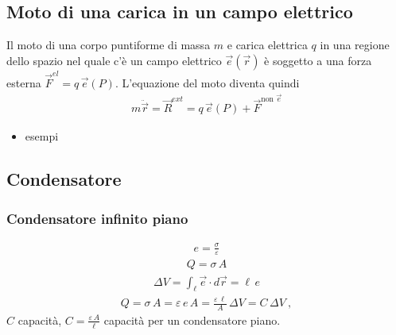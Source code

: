 \documentclass[letterpaper,10pt,italian]{jupyterBook}
\begin{document}
\subsection{Moto di una carica in un campo elettrico}
\label{\detokenize{ch/electromagnetism/electrostatics:moto-di-una-carica-in-un-campo-elettrico}}
\sphinxAtStartPar
Il moto di una corpo puntiforme di massa \(m\) e carica elettrica \(q\) in una regione dello spazio nel quale c’è un campo elettrico \(\vec{e}(\vec{r})\) è soggetto a una forza esterna \(\vec{F}^{el} = q \, \vec{e}(P)\). L’equazione del moto diventa quindi
\begin{equation*}
\begin{split}m \ddot{ \vec{r} } = \vec{R}^{ext} = q \, \vec{e}(P) + \vec{F}^{\text{non }\vec{e}}\end{split}
\end{equation*}\begin{itemize}
\item {} 
\sphinxAtStartPar
{} esempi

\end{itemize}


\subsection{Condensatore}
\label{\detokenize{ch/electromagnetism/electrostatics:condensatore}}

\subsubsection{Condensatore infinito piano}
\label{\detokenize{ch/electromagnetism/electrostatics:condensatore-infinito-piano}}\begin{equation*}
\begin{split}e = \frac{\sigma}{\varepsilon}\end{split}
\end{equation*}\begin{equation*}
\begin{split}Q = \sigma \, A\end{split}
\end{equation*}\begin{equation*}
\begin{split}\Delta V = \int_{\ell} \vec{e} \cdot d \vec{r} = \ell \, e\end{split}
\end{equation*}\begin{equation*}
\begin{split} Q = \sigma \, A = \varepsilon \, e \, A = \frac{\varepsilon \, \ell}{A} \, \Delta V = C \, \Delta V \ ,\end{split}
\end{equation*}
\sphinxAtStartPar
\(C\) capacità, \(C = \frac{\varepsilon \, A}{\ell}\) capacità per un condensatore piano.
\end{document}
